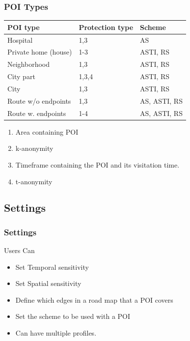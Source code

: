 \begin{frame}[red] %
\frametitle{POI Types}

\begin{table}
\begin{tabular}{|l|l|l|}
\hline
POI type 		& Protection type & Scheme \\\hline
Hospital		& 1,3 & AS \\\hline
Private home (house)	& 1-3 & ASTI, RS \\\hline
Neighborhood		& 1,3 & ASTI, RS  \\\hline
City part		& 1,3,4 & ASTI, RS  \\\hline
City			& 1,3 & ASTI, RS  \\\hline
Route w/o endpoints	& 1,3 & AS, ASTI, RS  \\\hline
Route w. endpoints	& 1-4 & AS, ASTI, RS  \\\hline
\end{tabular}
\end{table}

\begin{enumerate}
	\item Area containing POI
	\item k-anonymity
	\item Timeframe containing the POI and its visitation time.
	\item t-anonymity
\end{enumerate}

\end{frame}




\subsection{Settings} %


\begin{frame}[red] %
\frametitle{Settings}

Users Can
\begin{itemize}
\item Set Temporal sensitivity
\item Set Spatial sensitivity
\item Define which edges in a road map that a POI covers
\item Set the scheme to be used with a POI
\item Can have multiple profiles.
\end{itemize}

\end{frame}

